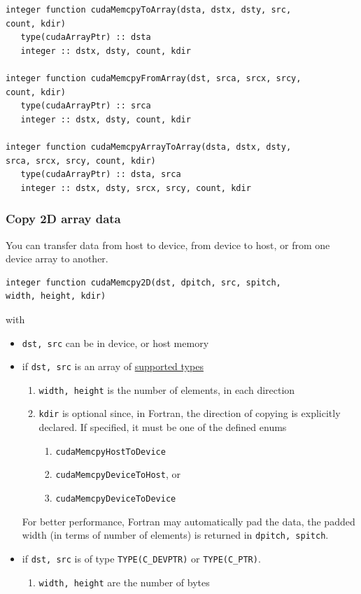 \begin{lstlisting}
integer function cudaMemcpyToArray(dsta, dstx, dsty, src,
count, kdir)
   type(cudaArrayPtr) :: dsta
   integer :: dstx, dsty, count, kdir

integer function cudaMemcpyFromArray(dst, srca, srcx, srcy,
count, kdir)
   type(cudaArrayPtr) :: srca
   integer :: dstx, dsty, count, kdir

integer function cudaMemcpyArrayToArray(dsta, dstx, dsty,
srca, srcx, srcy, count, kdir)
   type(cudaArrayPtr) :: dsta, srca
   integer :: dstx, dsty, srcx, srcy, count, kdir
\end{lstlisting}


\subsubsection{Copy 2D array data}
\label{sec:copy-2d-array}

You can transfer data from host to device, from device to host, or
from one device array to another. 
\begin{lstlisting}
integer function cudaMemcpy2D(dst, dpitch, src, spitch,
width, height, kdir)
\end{lstlisting}
with
\begin{itemize}
\item \verb!dst, src! can be in device, or host memory
\item if \verb!dst, src! is an array of
  \hyperref[sec:datatype-data-device]{supported types}
  \begin{enumerate}
  \item \verb!width, height! is the number of elements, in each
    direction
  \item \verb!kdir!  is optional since, in Fortran, the direction of
    copying is explicitly declared. If specified, it must be one of
    the defined enums
  \begin{enumerate}
  \item \verb!cudaMemcpyHostToDevice!
  \item \verb!cudaMemcpyDeviceToHost!, or
  \item \verb!cudaMemcpyDeviceToDevice!
  \end{enumerate}
  \end{enumerate}

  For better performance, Fortran may automatically pad the data, the
  padded width (in terms of number of elements) is returned in
  \verb!dpitch, spitch!.

\item if \verb!dst, src! is of type \verb!TYPE(C_DEVPTR)! or
  \verb!TYPE(C_PTR)!. 
  \begin{enumerate}
  \item \verb!width, height! are the number of bytes
  \end{enumerate}

\end{itemize}


